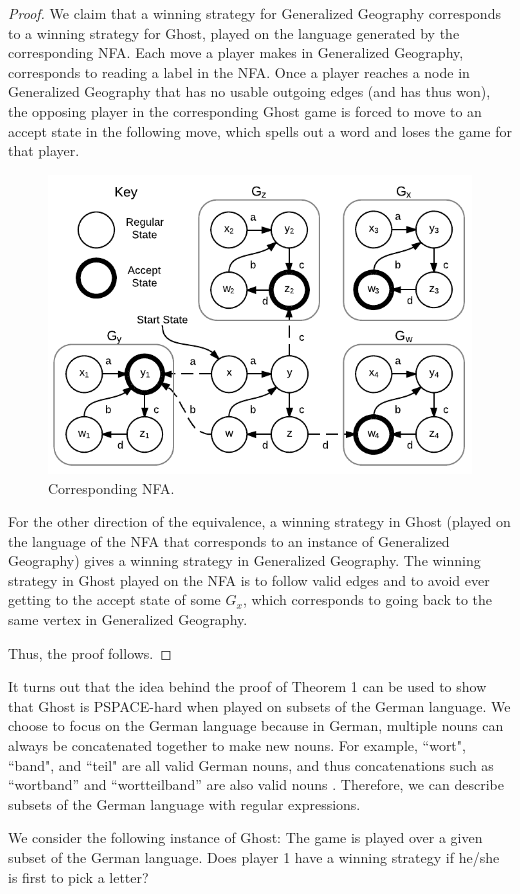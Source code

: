 \documentclass[runningheads,a4paper]{llncs}
\begin{document}
\begin{proof}
We claim that a winning strategy for Generalized Geography corresponds to a winning strategy for Ghost, played on the language generated by the corresponding NFA. Each move a player makes in Generalized Geography, corresponds to reading a label in the NFA. Once a player reaches a node in Generalized Geography that has no usable outgoing edges (and has thus won), the opposing player in the corresponding Ghost game is forced to move to an accept state in the following move, which spells out a word and loses the game for that player. 


\begin{figure}
\centering
\includegraphics[width=0.6\linewidth]{Ghost2.pdf}
\caption{Corresponding NFA.}
\label{fig:reduction}
\end{figure}

For the other direction of the equivalence, a winning strategy in Ghost (played on the language of the NFA that corresponds to an instance of Generalized Geography) gives a winning strategy in Generalized Geography. The winning strategy in Ghost played on the NFA is to follow valid edges and to avoid ever getting to the accept state of some $G_x$, which corresponds to going back to the same vertex in Generalized Geography.

Thus, the proof follows. 
\end{proof}

It turns out that the idea behind the proof of Theorem 1 can be used to show that Ghost is PSPACE-hard when played on subsets of the German language. We choose to focus on the German language because in German, multiple nouns can always be concatenated together to make new nouns. For example, ``wort", ``band", and ``teil" are all valid German nouns, and thus concatenations such as “wortband” and “wortteilband” are also valid nouns \cite{german}. Therefore, we can describe subsets of the German language with regular expressions.

We consider the following instance of Ghost: The game is played over a given subset of the German language. Does player 1 have a winning strategy if he/she is first to pick a letter?
\end{document}

